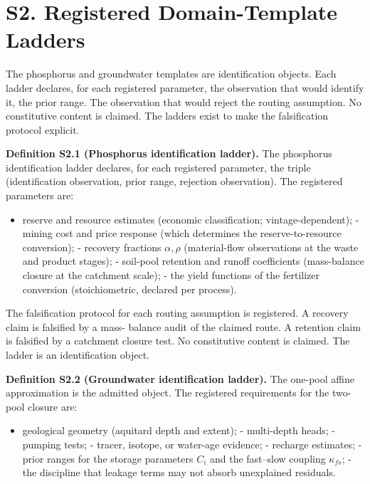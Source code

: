 \documentclass[11pt]{article}
\begin{document}
\vspace{0.8em}

\section*{S2. Registered Domain-Template Ladders}\label{s2-registered-domain-template-ladders}

The phosphorus and groundwater templates are identification objects. Each ladder declares, for each registered parameter, the observation that would identify it, the prior range. The observation that would reject the routing assumption. No constitutive content is claimed. The ladders exist to make the falsification protocol explicit.

\textbf{Definition S2.1 (Phosphorus identification ladder).} The phosphorus identification ladder declares, for each registered parameter, the triple (identification observation, prior range, rejection observation). The registered parameters are:

\begin{itemize}\setlength{\itemsep}{2pt}
\item reserve and resource estimates (economic classification; vintage-dependent); - mining cost and price response (which determines the reserve-to-resource conversion); - recovery fractions \(\alpha, \rho\) (material-flow observations at the waste and product stages); - soil-pool retention and runoff coefficients (mass-balance closure at the catchment scale); - the yield functions of the fertilizer conversion (stoichiometric, declared per process).
\end{itemize}

The falsification protocol for each routing assumption is registered. A recovery claim is falsified by a mass- balance audit of the claimed route. A retention claim is falsified by a catchment closure test. No constitutive content is claimed. The ladder is an identification object.

\textbf{Definition S2.2 (Groundwater identification ladder).} The one-pool affine approximation is the admitted object. The registered requirements for the two-pool closure are:

\begin{itemize}\setlength{\itemsep}{2pt}
\item geological geometry (aquitard depth and extent); - multi-depth heads; - pumping tests; - tracer, isotope, or water-age evidence; - recharge estimates; - prior ranges for the storage parameters \(C_i\) and the fast--slow coupling \(\kappa_{fs}\); - the discipline that leakage terms may not absorb unexplained residuals.
\end{itemize}
\end{document}
